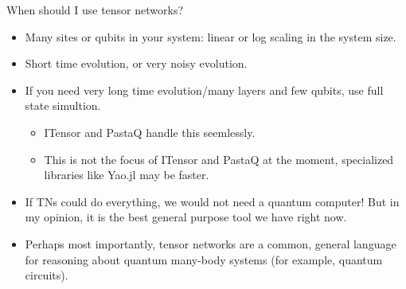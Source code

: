 \begin{frame}{When should I use tensor networks?}

\begin{itemize}[<+->]

  \item Many sites or qubits in your system: linear or log scaling in the system size.
  \item Short time evolution, or very noisy evolution.
  \item If you need very long time evolution/many layers and few qubits, use full state simultion.
    
  \begin{itemize}[<+->]

    \item ITensor and PastaQ handle this seemlessly.
    \item This is not the focus of ITensor and PastaQ at the moment, specialized libraries like Yao.jl may be faster.

  \end{itemize}

  \item If TNs could do everything, we would not need a quantum computer! But in my opinion, it is the best general purpose tool we have right now.
  \item Perhaps most importantly, tensor networks are a common, general language for reasoning about quantum many-body systems (for example, quantum circuits).

\end{itemize}


\end{frame}
